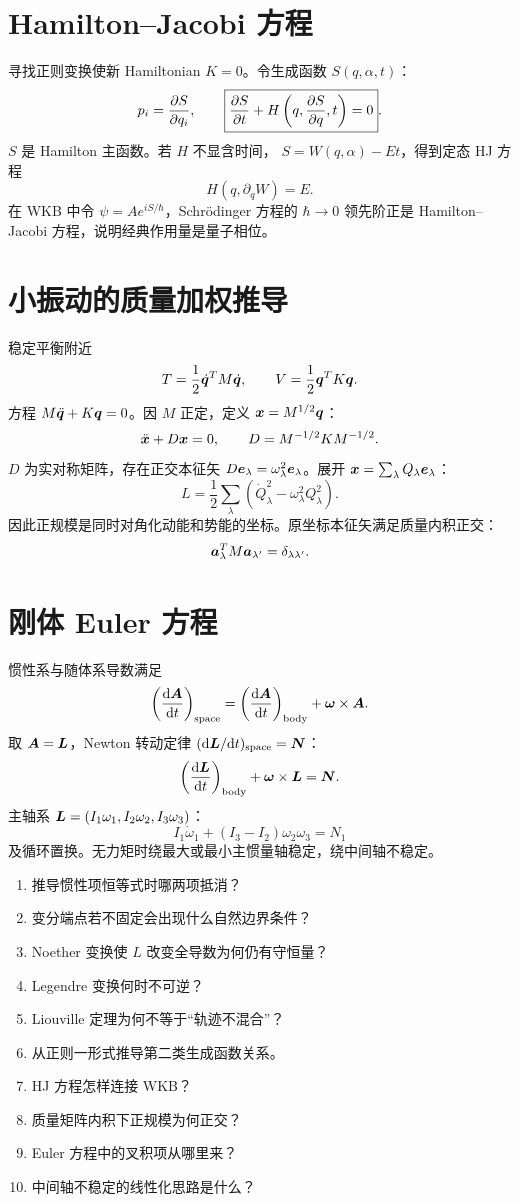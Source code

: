 \section{Hamilton--Jacobi 方程}
寻找正则变换使新 Hamiltonian $K=0$。令生成函数
$S(q,\alpha,t)$：
\[
p_i=\frac{\partial S}{\partial q_i},\qquad
\boxed{\frac{\partial S}{\partial t}+H\left(q,\frac{\partial S}{\partial q},t\right)=0}.
\]
$S$ 是 Hamilton 主函数。若 $H$ 不显含时间，
$S=W(q,\alpha)-Et$，得到定态 HJ 方程
\[
H(q,\partial_qW)=E.
\]
在 WKB 中令 $\psi=Ae^{iS/\hbar}$，Schrödinger 方程的
$\hbar\to0$ 领先阶正是 Hamilton--Jacobi 方程，说明经典作用量是量子相位。

\section{小振动的质量加权推导}
稳定平衡附近
\[
T=\frac12\dot{\bm{q}}^{T}M\dot{\bm{q}},\qquad
V=\frac12\bm{q}^TK\bm{q}.
\]
方程
$M\ddot{\bm{q}}+K\bm{q}=0$。因 $M$ 正定，定义
$\bm{x}=M^{1/2}\bm{q}$：
\[
\ddot{\bm{x}}+D\bm{x}=0,\qquad
D=M^{-1/2}KM^{-1/2}.
\]
$D$ 为实对称矩阵，存在正交本征矢
$D\bm{e}_\lambda=\omega_\lambda^2\bm{e}_\lambda$。展开
$\bm{x}=\sum_\lambda Q_\lambda\bm{e}_\lambda$：
\[
L=\frac12\sum_\lambda
(\dot Q_\lambda^2-\omega_\lambda^2Q_\lambda^2).
\]
因此正规模是同时对角化动能和势能的坐标。原坐标本征矢满足质量内积正交：
\[
\bm{a}_\lambda^TM\bm{a}_{\lambda'}=\delta_{\lambda\lambda'}.
\]

\section{刚体 Euler 方程}
惯性系与随体系导数满足
\[
\left(\frac{\mathrm d \bm{A}}{\mathrm d t}\right)_{\rm space}
=\left(\frac{\mathrm d \bm{A}}{\mathrm d t}\right)_{\rm body}
+\bm{\omega}\times\bm{A}.
\]
取 $\bm{A}=\bm{L}$，Newton 转动定律
$(\mathrm d\bm{L}/\mathrm d t)_{\rm space}=\bm{N}$：
\[
\left(\frac{\mathrm d \bm{L}}{\mathrm d t}\right)_{\rm body}
+\bm{\omega}\times\bm{L}=\bm{N}.
\]
主轴系 $\bm{L}=(I_1\omega_1,I_2\omega_2,I_3\omega_3)$：
\[
I_1\dot\omega_1+(I_3-I_2)\omega_2\omega_3=N_1
\]
及循环置换。无力矩时绕最大或最小主惯量轴稳定，绕中间轴不稳定。

\begin{selftestbox}
\begin{enumerate}
\item 推导惯性项恒等式时哪两项抵消？
\item 变分端点若不固定会出现什么自然边界条件？
\item Noether 变换使 $L$ 改变全导数为何仍有守恒量？
\item Legendre 变换何时不可逆？
\item Liouville 定理为何不等于“轨迹不混合”？
\item 从正则一形式推导第二类生成函数关系。
\item HJ 方程怎样连接 WKB？
\item 质量矩阵内积下正规模为何正交？
\item Euler 方程中的叉积项从哪里来？
\item 中间轴不稳定的线性化思路是什么？
\end{enumerate}
\end{selftestbox}
